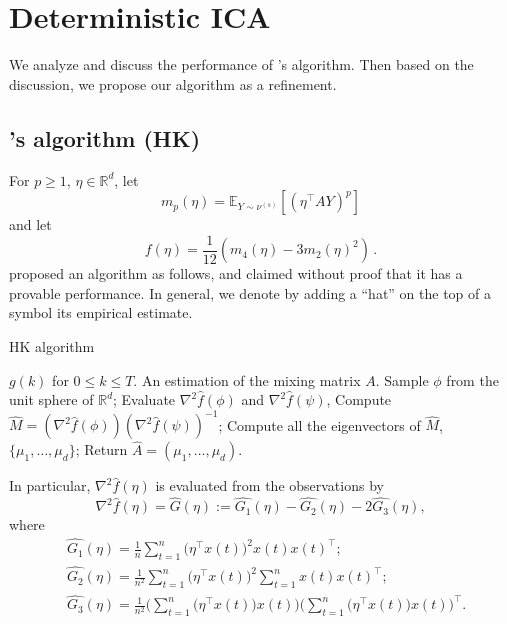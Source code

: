 \documentclass[twoside]{article}
\newcommand{\E}{\mathbb{E}}
\newcommand{\real}{\mathbb{R}}
\theoremstyle{definition}
\begin{document}
\section{Deterministic ICA}
\label{sec:DICA}
We analyze and discuss the performance of \citet{hsu2013learning}'s algorithm. Then based on the discussion, we propose our algorithm as a refinement.

\subsection{\citet{hsu2013learning}'s algorithm (HK)}
\label{subsec:HKalg}
For $p\ge 1$, $\eta\in \real^d$, 
let 
\begin{equation}
\label{eq:mpdef}
m_p(\eta) = \E_{Y\sim \nu^{(s)}}[ (\eta^\top A Y)^p ]
\end{equation}
 and let
\begin{equation}\label{eq:fdef}
f(\eta) = \frac1{12} \left( m_4(\eta) - 3 m_2(\eta)^2 \right)\,.
\end{equation}
\citet{DHsu2012} proposed an algorithm as follows, and claimed without proof that it has a provable performance. 
In general, we denote by adding a ``hat'' on the top of a symbol its empirical estimate.
\begin{algorithm}[H]
\caption{HK algorithm}
\begin{algorithmic}[1]
\INPUT $g(k)$ for $0\le k \le T$. 
\OUTPUT An estimation of the mixing matrix $A$. 
\STATE Sample $\phi$ from the unit sphere of $\real^d$;
\STATE Evaluate $\nabla^2\widehat{f}(\phi)$ and $\nabla^2\widehat{f}(\psi)$, 
\STATE Compute $\widehat{M} = (\nabla^2 \widehat{f}(\phi))(\nabla^2\widehat{f}(\psi))^{-1}$;
\STATE Compute all the eigenvectors of $\widehat{M}$, $\{\mu_1,\ldots,\mu_d\}$;
\STATE Return $\widehat{A} = (\mu_1,\ldots,\mu_d)$.
\end{algorithmic}
\end{algorithm}
In particular, $\nabla^2\widehat{f}(\eta)$  is evaluated from the observations by
\[
\nabla^2 \widehat{f}(\eta) = \widehat{G}(\eta):= \widehat{G_1}(\eta) - \widehat{G_2}(\eta) -2\widehat{G_3}(\eta),
\]
where 
\begin{align*}
&\widehat{ G_1}(\eta) = \frac1n\sum_{t=1}^{n} \big(\eta^{\top}x(t)\big)^2x(t)x(t)^{\top}; \\
& \widehat{G_2}(\eta) = \frac{1}{n^2}\sum_{t=1}^{n} \big(\eta^{\top}x(t)\big)^2 \sum_{t=1}^{n}x(t)x(t)^{\top}; \\
& \widehat{G_3}(\eta) = \frac{1}{n^2}\Big(\sum_{t=1}^{n} \big(\eta^{\top}x(t)\big)x(t)\Big) \Big(\sum_{t=1}^{n} \big(\eta^{\top}x(t)\big)x(t)\Big)^{\top}.
\end{align*} 
\end{document}
